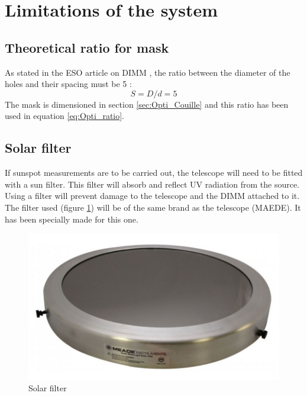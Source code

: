 \section{Limitations of the system}\label{sec:Opti_Limit}
\subsection{Theoretical ratio for mask}
As stated in the ESO article on DIMM \cite{DIMM_ESO}, the ratio between the diameter of the holes and their spacing must be 5 :
\begin{equation}\label{eq:Opti_Ratio}
    S = D/d = 5
\end{equation}
The mask is dimensioned in section \ref{sec:Opti_Couille} and this ratio has been used in equation \ref{eq:Opti_ratio}.
\subsection{Solar filter}
If sunspot measurements are to be carried out, the telescope will need to be fitted with a sun filter. This filter will
absorb and reflect UV radiation from the source. Using a filter will prevent damage to the telescope and the DIMM attached to it.
The filter used (figure \ref{fig:Opti_Filter}) will be of the same brand as the telescope (MAEDE). It has been specially made for this one.
\begin{figure}[H]
    \centering
    \includegraphics[scale=0.6]{assets/figures/Optical Design/Solar_filter.png}
    \caption{Solar filter}
    \label{fig:Opti_Filter}
\end{figure}
